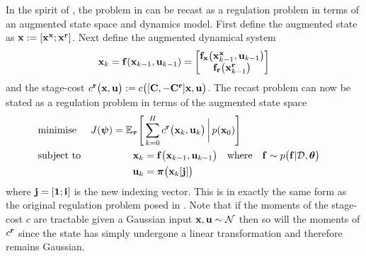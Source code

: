 In the spirit of \cite{BGW90}, the problem in  can be recast as a regulation problem in terms of an augmented state space and dynamics model. First define the augmented state as $\mathbf{x} := [\mathbf{x}^{\mathbf{x}}; \mathbf{x}^{\mathbf{r}}]$. Next define the augmented dynamical system
\begin{equation*}
\mathbf{x}_{k} =
\mathbf{f}(\mathbf{x}_{k-1}, \mathbf{u}_{k-1}) = \begin{bmatrix} 
\mathbf{f}_{\mathbf{x}}\big(\mathbf{x}^{\mathbf{x}}_{k-1},\mathbf{u}_{k-1}\big) \\
\mathbf{f}_{\mathbf{r}}\big(\mathbf{x}^{\mathbf{r}}_{k-1}\big)
 \end{bmatrix}
\end{equation*}
and the stage-cost $c^{\mathbf{r}}\big(\mathbf{x},\mathbf{u}\big) := c\big([\mathbf{C}, -\mathbf{C}^{\mathbf{r}}]\mathbf{x},\mathbf{u}\big)$. The recast problem can now be stated as a regulation problem in terms of the augmented state space
\begin{align}
& \text{minimise} & J(\boldsymbol{\psi}) = \mathbb{E}_{\boldsymbol{\tau}}\Bigg[ & \sum_{k=0}^{H} c^{\mathbf{r}}\big(\mathbf{x}_k ,\mathbf{u}_k \big)  \, \bigg| \, p(\mathbf{x}_0) \Bigg]
 \\
&\text{subject to} & \mathbf{x}_k &= \mathbf{f}\big(\mathbf{x}_{k-1},\mathbf{u}_{k-1}\big) 
\quad \text{where} \quad \mathbf{f} \sim p\big(\mathbf{f}|\mathcal{D},\boldsymbol{\theta}\big) & \\
\nonumber && \mathbf{u}_k &= \boldsymbol{\pi}\big( \mathbf{x}_k[\mathbf{j}] \big)
\end{align}
where $\mathbf{j}=[\mathbf{1}; \mathbf{i}]$ is the new indexing vector. This is in exactly the same form as the original regulation problem posed in . Note that if the moments of the stage-cost $c$ are tractable given a Gaussian input $\mathbf{x},\mathbf{u} \sim \mathcal{N}$ then so will the moments of $c^{\mathbf{r}}$ since the state has simply undergone a linear transformation and therefore remains Gaussian.



